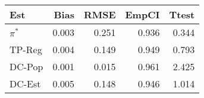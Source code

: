 
\begin{tabular}{lrrrr}
\toprule
Est & Bias & RMSE & EmpCI & Ttest\\
\midrule
$\pi^*$ & 0.003 & 0.251 & 0.936 & 0.344\\
TP-Reg & 0.004 & 0.149 & 0.949 & 0.793\\
DC-Pop & 0.001 & 0.015 & 0.961 & 2.425\\
DC-Est & 0.005 & 0.148 & 0.946 & 1.014\\
\bottomrule
\end{tabular}